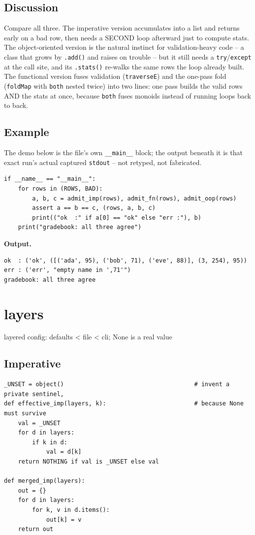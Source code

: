 \documentclass[10pt,letterpaper]{book}
\begin{document}
\section*{Discussion}

Compare all three. The imperative version accumulates into a list and
returns early on a bad row, then needs a SECOND loop afterward just to
compute stats. The object-oriented version is the natural instinct for
validation-heavy code -- a class that grows by \texttt{.add()} and raises
on trouble -- but it still needs a \texttt{try}/\texttt{except} at the
call site, and its \texttt{.stats()} re-walks the same rows the loop
already built. The functional version fuses validation
(\texttt{traverseE}) and the one-pass fold (\texttt{foldMap} with
\texttt{both} nested twice) into two lines: one pass builds the valid
rows AND the stats at once, because \texttt{both} fuses monoids instead
of running loops back to back.

\section*{Example}
The demo below is the file's own \texttt{\_\_main\_\_} block; the output beneath it is that exact run's actual captured \texttt{stdout} -- not retyped, not fabricated.
\begin{lstlisting}[style=code]
if __name__ == "__main__":
    for rows in (ROWS, BAD):
        a, b, c = admit_imp(rows), admit_fn(rows), admit_oop(rows)
        assert a == b == c, (rows, a, b, c)
        print(("ok  :" if a[0] == "ok" else "err :"), b)
    print("gradebook: all three agree")
\end{lstlisting}
\noindent\textbf{Output.}
\begin{lstlisting}[style=ex]
ok  : ('ok', ([('ada', 95), ('bob', 71), ('eve', 88)], (3, 254), 95))
err : ('err', "empty name in ',71'")
gradebook: all three agree
\end{lstlisting}
\chapter{layers}
layered config: defaults < file < cli; None is a real value

\section*{Imperative}
\begin{lstlisting}[style=code]
_UNSET = object()                                     # invent a private sentinel,
def effective_imp(layers, k):                         # because None must survive
    val = _UNSET
    for d in layers:
        if k in d:
            val = d[k]
    return NOTHING if val is _UNSET else val

def merged_imp(layers):
    out = {}
    for d in layers:
        for k, v in d.items():
            out[k] = v
    return out
\end{lstlisting}
\end{document}
